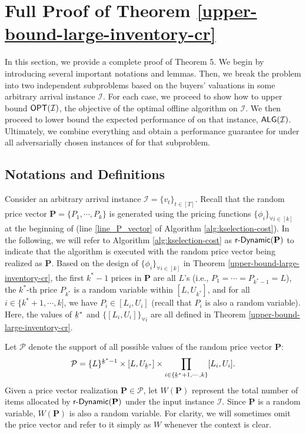 \section{Full Proof of Theorem \ref{upper-bound-large-inventory-cr}}
\label{appendix:proof-upper-bound-large-inventory-cr}
In this section, we provide a complete proof of Theorem 5. We begin by introducing several important notations and lemmas. Then, we break the problem into two independent subproblems based on the buyers' valuations in some arbitrary arrival instance $\mathcal{I}$. For each case, we proceed to show how to upper bound $\textsf{OPT}(\mathcal{I})$, the objective of the optimal offline algorithm on $\mathcal{I}$. We then proceed to lower bound the expected performance of \rDynamic on that instance, $\textsf{ALG}(\mathcal{I})$. Ultimately, we combine everything and obtain a performance guarantee for \rDynamic under all adversarially chosen instances of \OSDoS for that subproblem.



\subsection{Notations and Definitions}
Consider an arbitrary arrival instance  $\mathcal{I} = \{v_{t}\}_{t \in [T]}$. Recall that the random price vector $\mathbf{P} = \{P_1, \cdots, P_k\} $ is generated using the pricing functions $\{\phi_{i}\}_{\forall i \in [k]}$ at the beginning of \rDynamic (line \ref{line_P_vector} of Algorithm \ref{alg:kselection-cost}). In the following, we will refer to Algorithm \ref{alg:kselection-cost}  as $\textsf{r-Dynamic}(\mathbf{P})$ to indicate that the algorithm is executed with the random price vector being realized as $ \mathbf{P}$. Based on the design of  $\{\phi_{i}\}_{\forall i \in [k]}$ in Theorem \ref{upper-bound-large-inventory-cr}, the first $ k^* - 1 $ prices in $ \mathbf{P} $ are all $ L $'s (i.e., $ P_1 = \cdots = P_{k^* - 1} =  L $), the $ k^*$-th price $ P_{k^*} $ is a random variable within $ [L, U_{k^*}]$, and for all $ i \in \{k^*+1, \cdots, k]$, we have $ P_i  \in [L_i, U_i] $ (recall that $ P_i $ is also a random variable). Here, the values of $\ubar{k}^{*} $ and $ \{[L_i,U_i]\}_{\forall i} $ are all defined in Theorem \ref{upper-bound-large-inventory-cr}. 

Let $\mathcal{P}$ denote the support of all possible values of the random price vector $\mathbf{P}$:
\begin{align*}
    \mathcal{P} = \{L\}^{\ubar{k}^{*}-1} \times [L,U_{\ubar{k}^{*}}] \times \prod_{i \in\{\ubar{k}^{*}+1,\cdots, k\}} [L_{i}, U_{i}].
\end{align*}
Given a price vector realization $\mathbf{P} \in \mathcal{P}$, let $W(\mathbf{P})$ represent the total number of items allocated by $\textsf{r-Dynamic}(\mathbf{P})$ under the input instance $\mathcal{I}$. Since $\mathbf{P}$ is a random variable, $W(\mathbf{P})$ is also a random variable. For clarity, we will sometimes omit the price vector and refer to it simply as $W$ whenever the context is clear.

